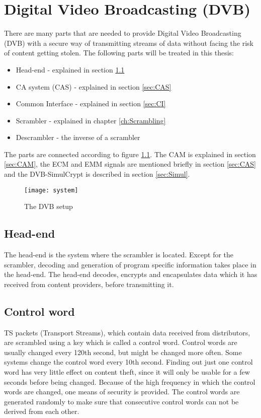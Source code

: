 \chapter{Digital Video Broadcasting (DVB)}\label{ch:DVB}
There are many parts that are needed to provide Digital Video 
Broadcasting (DVB) with a secure way of transmitting streams of data 
without facing the risk of content getting stolen. The following parts 
will be treated in this thesis:

\begin{itemize}
\item Head-end - explained in section \ref{sec:HE}
\item CA system (CAS) - explained in section \ref{sec:CAS}
\item Common Interface - explained in section \ref{sec:CI}
\item Scrambler - explained in chapter \ref{ch:Scrambling}
\item Descrambler - the inverse of a scrambler
\end{itemize}

The parts are connected according to figure \ref{fig:system}. The CAM 
is explained in section \ref{sec:CAM}, the ECM and EMM signals are 
mentioned briefly in section \ref{sec:CAS} and the DVB-SimulCrypt is 
described in section \ref{sec:Simul}.

\begin{figure}[h!]
  \texttt{[image: system]}
  \caption{The DVB setup}
  \label{fig:system}
\end{figure}

\section{Head-end} \label{sec:HE}
The head-end is the system where the scrambler is located. Except for 
the scrambler, decoding and generation of program specific information 
takes place in the head-end. The head-end decodes, encrypts and 
encapsulates data which it has received from content providers, 
before transmitting it.

\section{Control word} \label{sec:setup}
TS packets (Transport Streams), which contain data received from 
distributors, are scrambled using a key which is called a 
control word. Control words are usually changed every 120th second, 
but might be changed more often. Some systems change the control word 
every 10th second. Finding out just one control word has very little 
effect on content theft, since it will only be usable for a few 
seconds before being changed. Because of the high frequency in which 
the control words are changed, one means of security is provided. The 
control words are generated randomly to make sure that consecutive 
control words can not be derived from each other.

